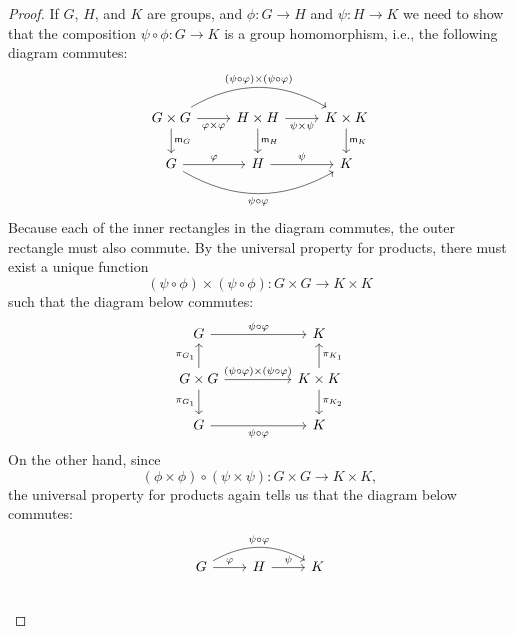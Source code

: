 \begin{proof}
    If \(G\), \(H\), and \(K\) are groups, and \(\phi: G \to H\) and \(\psi: H
    \to K\) we need to show that the composition \(\psi \circ \phi: G \to K\) is
    a group homomorphism, i.e., the following diagram commutes:
    \[
        \begin{tikzcd}
            G \times G \arrow[d, "\mult_G"] \arrow[r, "\phi \times \phi"'] \arrow[rr, "(\psi \circ \phi) \times (\psi \circ \phi)", bend left] & H\times H \arrow[d, "\mult_H"] \arrow[r, "\psi \times \psi"'] & K\times K \arrow[d, "\mult_K"] \\
            G \arrow[r, "\phi"] \arrow[rr, "\psi \circ \phi"', bend right]                                                                       & H \arrow[r, "\psi"]                                           & K                             
            \end{tikzcd}
    \]
    Because each of the inner rectangles in the diagram commutes, the outer
    rectangle must also commute. By the universal property for products, there
    must exist a unique function
    \[
        (\psi \circ \phi) \times (\psi \circ \phi): G \times G \to K \times K
    \]
    such that the diagram below commutes:
    \[
        \begin{tikzcd}
            G \arrow[rr, "\psi \circ \phi"]                                                                                &  & K                                                        \\
            G\times G \arrow[d, "\pi_{G_1}"'] \arrow[u, "\pi_{G_1}"] \arrow[rr, "(\psi \circ \phi)\times(\psi \circ\phi)"] &  & K\times K \arrow[u, "\pi_{K_1}"'] \arrow[d, "\pi_{K_2}"] \\
            G \arrow[rr, "\psi \circ \phi"']                                                                                          &  & K                                                       
            \end{tikzcd}
    \]
    On the other hand, since
    \[
            (\phi \times \phi) \circ (\psi \times \psi) : G \times G \to K \times K,
    \]
    the universal property for products again tells us that the diagram below
    commutes:
    \[
        \begin{tikzcd}
            G \arrow[r, "\phi"] \arrow[rr, "\psi \circ \phi", bend left]                         & H \arrow[r, "\psi"]                                                                  & K                                                        \\

\end{tikzcd}\]
\end{proof}
